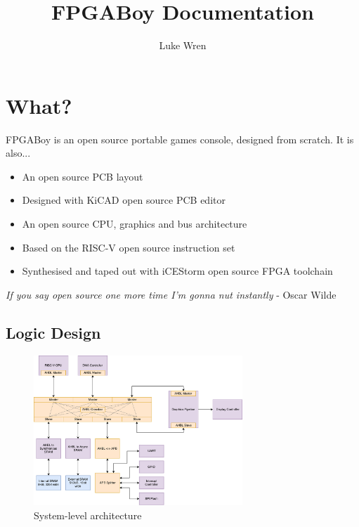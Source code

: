 \documentclass{article}
\title{FPGABoy Documentation}
\author{Luke Wren}
\begin{document}
\maketitle
\tableofcontents
\newpage
{}

\section{What?}

FPGABoy is an open source portable games console, designed from scratch. It is also...
\begin{itemize}
\item An open source PCB layout
\item Designed with KiCAD open source PCB editor
\item An open source CPU, graphics and bus architecture
\item Based on the RISC-V open source instruction set
\item Synthesised and taped out with iCEStorm open source FPGA toolchain
\end{itemize}

\begin{displayquote}
\textit{If you say open source one more time I'm gonna nut instantly} - Oscar Wilde
\end{displayquote}

\subsection{Logic Design}

\begin{figure}[!htb]
\caption{System-level architecture}
\label{diagram:system_arch}
\centering
\includegraphics[width=0.7\textwidth]{diagrams/system_arch.pdf}
\end{figure}
\end{document}
